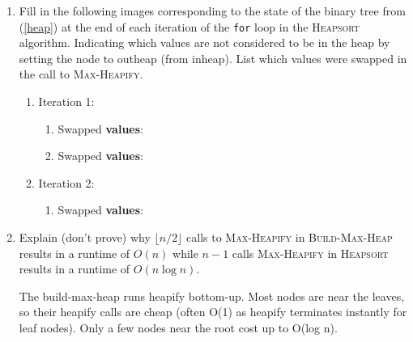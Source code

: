 \documentclass[11pt]{article}
\begin{document}
\begin{enumerate}
    \item Fill in the following images corresponding to the state of the binary tree from (\ref{heap}) at the end of each iteration of the \texttt{for} loop in the \textsc{Heapsort} algorithm. Indicating which values are not considered to be in the heap by setting the node to outheap (from inheap). List which values were swapped in the call to \textsc{Max-Heapify}.


    \begin{enumerate}
        \item Iteration 1:
        \begin{enumerate}
            \item Swapped \textbf{values}:
            \item Swapped \textbf{values}:
        \end{enumerate}
        \item Iteration 2:
        \begin{enumerate}
            \item Swapped \textbf{values}:
        \end{enumerate}
    \end{enumerate}


    \item Explain (don't prove) why $\lfloor n/2 \rfloor$ calls to \textsc{Max-Heapify} in \textsc{Build-Max-Heap} results in a runtime of $O(n)$ while $n-1$ calls \textsc{Max-Heapify} in \textsc{Heapsort} results in a runtime of $O(n\log n)$.
    
    The build-max-heap runs heapify bottom-up. Most nodes are near the leaves, so their heapify calls are cheap (often O(1) as heapify terminates instantly for leaf nodes). Only a few nodes near the root cost up to O(log n). 
    

\end{enumerate}
\end{document}
